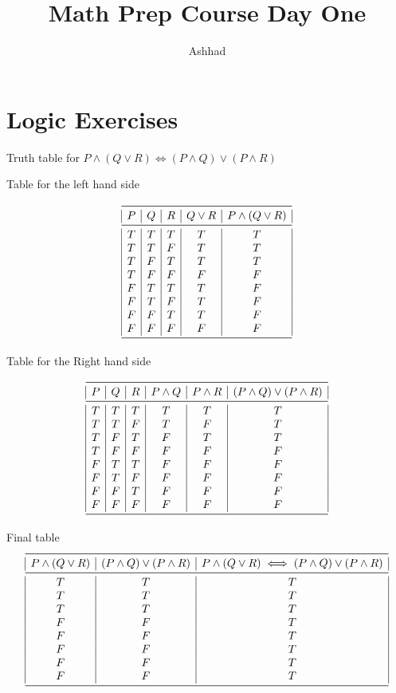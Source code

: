 \documentclass[a4paper]{article}
\title{Math Prep Course Day One}
\author{Ashhad}
\begin{document}
\maketitle

\section{Logic Exercises}
\begin{question}{}{}
Truth table for \(P \land (Q \lor R) \iff (P \land Q) \lor (P \land R)\)
\end{question}

Table for the left hand side

\[
\begin{array}{|c|c|c|c|c|}
\midrule
P & Q & R & Q \lor R & P \land (Q \lor R) \\
\midrule
T & T & T & T & T \\
T & T & F & T & T \\
T & F & T & T & T \\
T & F & F & F & F \\
F & T & T & T & F \\
F & T & F & T & F \\
F & F & T & T & F \\
F & F & F & F & F \\
\midrule
\end{array}
\]

Table for the Right hand side

\[
\begin{array}{|c|c|c|c|c|c|}
\midrule
P & Q & R & P \land Q & P \land R  & (P \land Q) \lor (P \land R) \\
\midrule
T & T & T & T & T & T \\
T & T & F & T & F & T \\
T & F & T & F & T & T \\
T & F & F & F & F & F \\
F & T & T & F & F & F \\
F & T & F & F & F & F \\
F & F & T & F & F & F \\
F & F & F & F & F & F \\
\midrule
\end{array}
\]

Final table
\[
\begin{array}{|c|c|c|}
\midrule
P \land (Q \lor R) &(P \land Q) \lor (P \land R) & P \land (Q \lor R) \iff (P \land Q) \lor (P \land R)\\
\midrule
T & T & T \\
T & T & T \\
T & T & T \\
F & F & T \\
F & F & T \\
F & F & T \\
F & F & T \\
F & F & T \\
\midrule
\end{array}
\]
\end{document}
